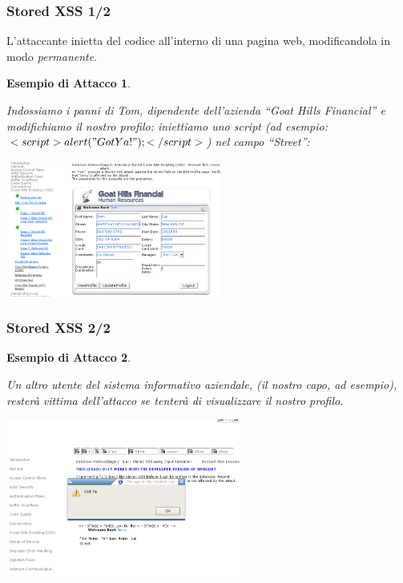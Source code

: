 \documentclass{beamer}
\newtheorem{myexample}{Esempio di Attacco}
\begin{document}
\begin{frame}
  \frametitle{Stored XSS 1/2}
  L'attaccante inietta del codice all'interno di una pagina web, modificandola in modo \emph{permanente}.
  \pause
  \begin{myexample}
    \begin{tiny}
      Indossiamo i panni di Tom, dipendente dell'azienda ``Goat Hills Financial'' e modifichiamo il nostro profilo: iniettiamo uno script (ad esempio: $<script> alert("Got Ya!"); </script>$) nel campo ``Street'':
      \begin{center}
	\includegraphics[width=200pt]{images/xss_stored_1.png}
      \end{center}
    \end{tiny}
  \end{myexample}
\end{frame}

\begin{frame}
  \frametitle{Stored XSS 2/2} 
  \begin{myexample}
    \begin{tiny}
      Un altro utente del sistema informativo aziendale, (il nostro capo, ad esempio), rester\`a vittima dell'attacco se tenter\`a di visualizzare il nostro profilo.
      \begin{center}
	\includegraphics[width=220pt]{images/xss_stored_2.png}
      \end{center}
    \end{tiny}
  \end{myexample}
\end{frame}
\end{document}
